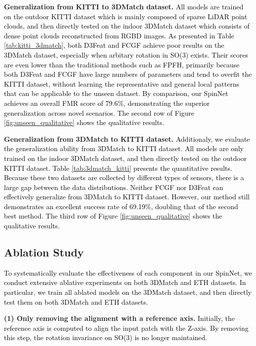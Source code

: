 \documentclass[final]{cvpr}
\newcommand{\qy}[1]{\textcolor{black}{#1}}
\newcommand{\nickname}{SpinNet}
\begin{document}
\textbf{Generalization from KITTI to 3DMatch dataset.} \qy{All models are trained on the outdoor KITTI dataset which is mainly composed of sparse LiDAR point clouds, and then directly tested on the indoor 3DMatch dataset which consists of dense point clouds reconstructed from RGBD images. 
As presented in Table \ref{tab:kitti_3dmatch}, both D3Feat and FCGF achieve poor results on the 3DMatch dataset, especially when arbitary rotation in SO(3) exists. Their scores are even lower than the traditional methods such as FPFH, primarily because both D3Feat and FCGF have large numbers of parameters and tend to overfit the KITTI dataset, without learning the representative and general local patterns that can be applicable to the unseen dataset. By comparison, our \nickname{} achieves an overall FMR score of 79.6\%, demonstrating the superior generalization across novel scenarios. The second row of Figure \ref{fig:unseen_qualitative} shows the qualitative results. }


\textbf{Generalization from 3DMatch to KITTI dataset.} \qy{Additionaly, we evaluate the generalization ability from 3DMatch to KITTI dataset. All models are only trained on the indoor 3DMatch dataset, and then directly tested on the outdoor KITTI dataset. Table \ref{tab:3dmatch_kitti} presents the quantitative results. Because these two datasets are collected by different types of sensors, there is a large gap between the data distributions. Neither FCGF nor D3Feat can effectively generalize from 3DMatch to KITTI dataset. However, our method still demonstrates an excellent success rate of 69.19\%, doubling that of the second best method. The third row of Figure \ref{fig:unseen_qualitative} shows the qualitative results.}







 
\subsection{Ablation Study}
\label{Ex: abaltion}


\qy{
To systematically evaluate the effectiveness of each component in our \nickname{}, we conduct extensive ablative experiments on both 3DMatch and ETH datasets. In particular, we train all ablated models on the 3DMatch dataset, and then directly test them on both 3DMatch and ETH datasets.}

\smallskip\noindent\textbf{(1) Only removing the alignment with a reference axis.} \qy{
Initially, the reference axis is computed to align the input patch with the Z-axis. By removing this step, the rotation invariance on SO(3) is no longer maintained.}
\end{document}

